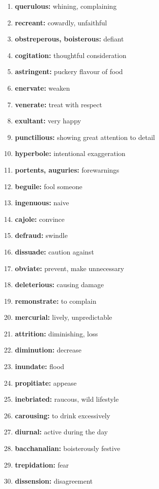 \documentclass{article}
\begin{document}
\begin{enumerate}
    \item \textbf{querulous: }{whining, complaining}
    \item \textbf{recreant: }{cowardly, unfaithful}
    \item \textbf{obstreperous, boisterous: }{defiant}
    \item \textbf{cogitation: }{thoughtful consideration}
    \item \textbf{astringent: }{puckery flavour of food}
    \item \textbf{enervate: }{weaken}
    \item \textbf{venerate: }{treat with respect}
    \item \textbf{exultant: }{very happy}
    \item \textbf{punctilious: }{showing great attention to detail}
    \item \textbf{hyperbole: }{intentional exaggeration}
    \item \textbf{portents, auguries: }{forewarnings}
    \item \textbf{beguile: }{fool someone}
    \item \textbf{ingenuous: }{naive}
    \item \textbf{cajole: }{convince}
    \item \textbf{defraud: }{swindle}
    \item \textbf{dissuade: }{caution against}
    \item \textbf{obviate: }{prevent, make unnecessary}
    \item \textbf{deleterious: }{causing damage}
    \item \textbf{remonstrate: }{to complain}
    \item \textbf{mercurial: }{lively, unpredictable}
    \item \textbf{attrition: }{diminishing, loss}
    \item \textbf{diminution: }{decrease}
    \item \textbf{inundate: }{flood}
    \item \textbf{propitiate: }{appease}
    \item \textbf{inebriated: }{raucous, wild lifestyle}
    \item \textbf{carousing: }{to drink excessively}
    \item \textbf{diurnal: }{active during the day}
    \item \textbf{bacchanalian: }{boisterously festive}
    \item \textbf{trepidation: }{fear}
    \item \textbf{dissension: }{disagreement}

\end{enumerate}
\end{document}
